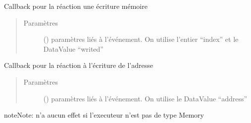 \documentclass[letterpaper,10pt,french]{sphinxmanual}
\begin{document}
\begin{fulllineitems}
\begin{fulllineitems}
\label{\detokenize{widgets:widgets.MemoryWidget.onwrite}}
Callback pour la réaction une écriture mémoire
\begin{quote}\begin{description}
\item[{Paramètres}] \leavevmode
{} (\sphinxstyleliteralemphasis{\sphinxupquote{{[}}}\sphinxstyleliteralemphasis{\sphinxupquote{, }}\sphinxstyleliteralemphasis{\sphinxupquote{{]}}}) \textendash{} paramètres liés à l’événement. On utilise l’entier “index” et le DataValue “writed”

\end{description}\end{quote}

\end{fulllineitems}


\begin{fulllineitems}
\label{\detokenize{widgets:widgets.MemoryWidget.onwriteaddress}}
Callback pour la réaction à l’écriture de l’adresse
\begin{quote}\begin{description}
\item[{Paramètres}] \leavevmode
{} (\sphinxstyleliteralemphasis{\sphinxupquote{{[}}}\sphinxstyleliteralemphasis{\sphinxupquote{, }}\sphinxstyleliteralemphasis{\sphinxupquote{{]}}}) \textendash{} paramètres liés à l’événement. On utilise le DataValue “address”

\end{description}\end{quote}

\begin{sphinxadmonition}{note}{Note:}
n’a aucun effet si l’executeur n’est pas de type Memory
\end{sphinxadmonition}


\end{fulllineitems}
\end{fulllineitems}
\end{document}
